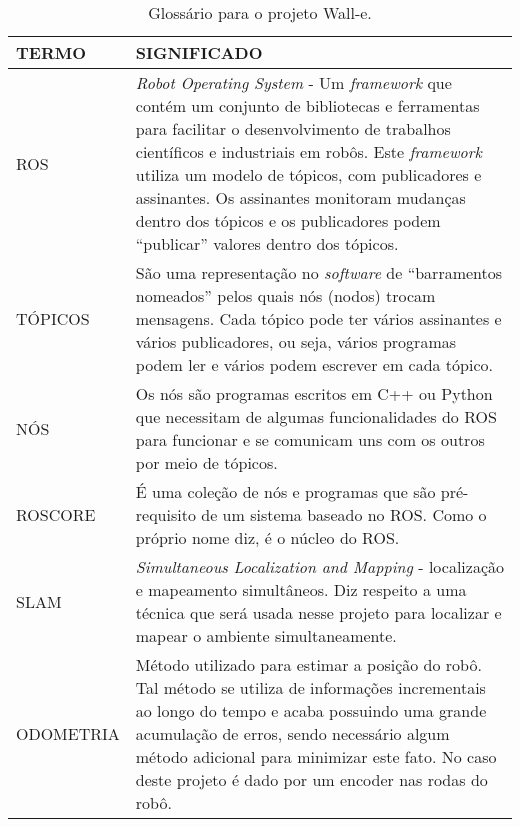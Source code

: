 \begin{table}[h]
\caption{\small{Glossário para o projeto Wall-e.}}
\begin{tabular}{p{2.5cm}|p{12cm}}
\hline
TERMO & SIGNIFICADO \\
\hline
ROS                         & \textit{Robot Operating System} - Um \textit{framework} que contém um conjunto de bibliotecas e ferramentas para facilitar o desenvolvimento de trabalhos científicos e industriais em robôs. Este \textit{framework} utiliza um modelo de tópicos, com publicadores e assinantes. Os assinantes monitoram mudanças dentro dos tópicos e os publicadores podem “publicar” valores dentro dos tópicos. \\
TÓPICOS                     & São uma representação no \textit{software} de “barramentos nomeados” pelos quais nós (nodos) trocam mensagens. Cada tópico pode ter vários assinantes e vários publicadores, ou seja, vários programas podem ler e vários podem escrever em cada tópico.                                                                                                                            \\
NÓS                         & Os nós são programas escritos em C++ ou Python que necessitam de algumas funcionalidades do ROS para funcionar e se comunicam uns com os outros por meio de tópicos.                                                                                                                                                                                                       \\
ROSCORE                     & É uma coleção de nós e programas que são pré-requisito de um sistema baseado no ROS. Como o próprio nome diz, é o núcleo do ROS.                                                                                                                                                                                                                                           \\
SLAM                        & \textit{Simultaneous Localization and Mapping} - localização e mapeamento simultâneos. Diz respeito a uma técnica que será usada nesse projeto para localizar e mapear o ambiente simultaneamente.                                                                                                                                                                                  \\
ODOMETRIA                   & Método utilizado para estimar a posição do robô. Tal método se utiliza de informações incrementais ao longo do tempo e acaba possuindo uma grande acumulação de erros, sendo necessário algum método adicional para minimizar este fato. No caso deste projeto é dado por um encoder nas rodas do robô.                                                                    \\

\end{tabular}
\end{table}
